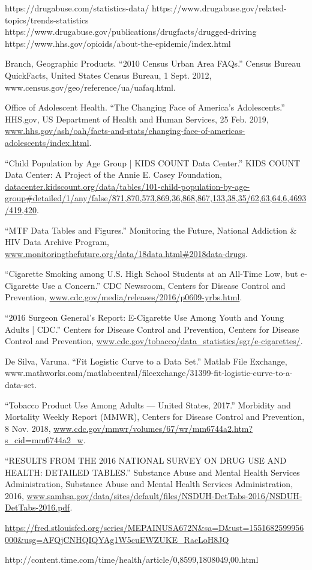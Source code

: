 \documentclass[12pt]{article}
\begin{document}
\newpage
\begin{thebibliography}{}
 https://drugabuse.com/statistics-data/ 
 https://www.drugabuse.gov/related-topics/trends-statistics 
 https://www.drugabuse.gov/publications/drugfacts/drugged-driving 
 https://www.hhs.gov/opioids/about-the-epidemic/index.html 

 Branch, Geographic Products. “2010 Census Urban Area FAQs.” Census Bureau QuickFacts, United States Census Bureau, 1 Sept. 2012, www.census.gov/geo/reference/ua/uafaq.html.

 Office of Adolescent Health. “The Changing Face of America's Adolescents.” HHS.gov, US Department of Health and Human Services, 25 Feb. 2019, \url{www.hhs.gov/ash/oah/facts-and-stats/changing-face-of-americas-adolescents/index.html}.

 “Child Population by Age Group | KIDS COUNT Data Center.” KIDS COUNT Data Center: A Project of the Annie E. Casey Foundation, \url{datacenter.kidscount.org/data/tables/101-child-population-by-age-group#detailed/1/any/false/871,870,573,869,36,868,867,133,38,35/62,63,64,6,4693/419,420}.

 “MTF Data Tables and Figures.” Monitoring the Future, National Addiction \& HIV Data Archive Program, \url{www.monitoringthefuture.org/data/18data.html#2018data-drugs}.

 “Cigarette Smoking among U.S. High School Students at an All-Time Low, but e-Cigarette Use a Concern.” CDC Newsroom, Centers for Disease Control and Prevention, \url{www.cdc.gov/media/releases/2016/p0609-yrbs.html}.

 “2016 Surgeon General's Report: E-Cigarette Use Among Youth and Young Adults | CDC.” Centers for Disease Control and Prevention, Centers for Disease Control and Prevention, \url{www.cdc.gov/tobacco/data_statistics/sgr/e-cigarettes/}.

 De Silva, Varuna. “Fit Logistic Curve to a Data Set.” Matlab File Exchange, www.mathworks.com/matlabcentral/fileexchange/31399-fit-logistic-curve-to-a-data-set.

“Tobacco Product Use Among Adults — United States, 2017.” Morbidity and Mortality Weekly Report (MMWR), Centers for Disease Control and Prevention, 8 Nov. 2018, \url{www.cdc.gov/mmwr/volumes/67/wr/mm6744a2.htm?s_cid=mm6744a2_w}.

 “RESULTS FROM THE 2016 NATIONAL SURVEY ON DRUG USE AND HEALTH: DETAILED TABLES.” Substance Abuse and Mental Health Services Administration, Substance Abuse and Mental Health Services Administration, 2016, \url{www.samhsa.gov/data/sites/default/files/NSDUH-DetTabs-2016/NSDUH-DetTabs-2016.pdf}.

 \url{https://fred.stlouisfed.org/series/MEPAINUSA672N&sa=D&ust=1551682599956000&usg=AFQjCNHQIQYAg1W5cuEWZUKE_RacLoH8JQ}

 http://content.time.com/time/health/article/0,8599,1808049,00.html

\label{bibliography}
\end{thebibliography}
\end{document}
